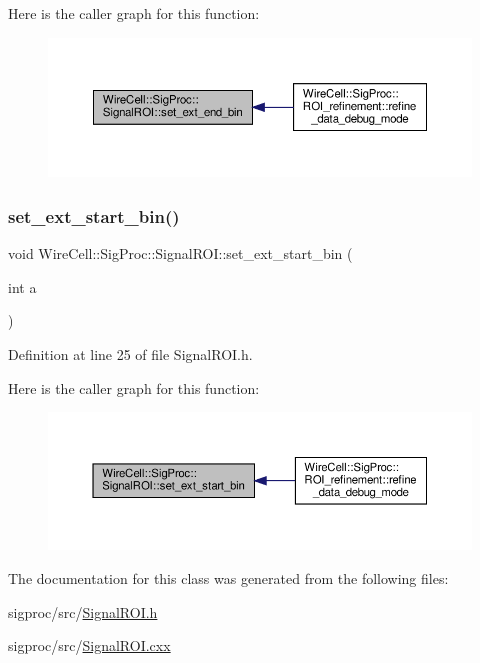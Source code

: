 Here is the caller graph for this function\+:
\nopagebreak
\begin{figure}[H]
\begin{center}
\leavevmode
\includegraphics[width=350pt]{class_wire_cell_1_1_sig_proc_1_1_signal_r_o_i_a1057a64f15a6093ab46679c4d54524ba_icgraph}
\end{center}
\end{figure}
\mbox{\label{class_wire_cell_1_1_sig_proc_1_1_signal_r_o_i_ae20c381a6855844b0177f2ab96ac50a6}} 
\subsubsection{\texorpdfstring{set\+\_\+ext\+\_\+start\+\_\+bin()}{set\_ext\_start\_bin()}}
{\footnotesize\ttfamily void Wire\+Cell\+::\+Sig\+Proc\+::\+Signal\+R\+O\+I\+::set\+\_\+ext\+\_\+start\+\_\+bin (\begin{DoxyParamCaption}\item[{int}]{a }\end{DoxyParamCaption})\hspace{0.3cm}{\ttfamily [inline]}}



Definition at line 25 of file Signal\+R\+O\+I.\+h.

Here is the caller graph for this function\+:
\nopagebreak
\begin{figure}[H]
\begin{center}
\leavevmode
\includegraphics[width=350pt]{class_wire_cell_1_1_sig_proc_1_1_signal_r_o_i_ae20c381a6855844b0177f2ab96ac50a6_icgraph}
\end{center}
\end{figure}


The documentation for this class was generated from the following files\+:\begin{DoxyCompactItemize}
\item 
sigproc/src/\hyperlink{_signal_r_o_i_8h}{Signal\+R\+O\+I.\+h}\item 
sigproc/src/\hyperlink{_signal_r_o_i_8cxx}{Signal\+R\+O\+I.\+cxx}\end{DoxyCompactItemize}
